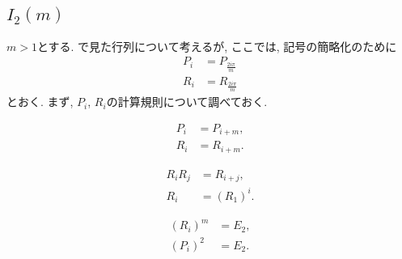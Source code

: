 \subsection{$I_2(m)$}
\label{ex:i2m:grp}
$m>1$とする.
で見た行列について考えるが,
ここでは, 記号の簡略化のために
\begin{align*}
  P_i&=P_{\frac{2i\pi}{m}}\\
  R_i&=R_{\frac{2i\pi}{m}}
\end{align*}
とおく.
まず, $P_i$, $R_i$の計算規則について調べておく.
\begin{lemma}
  \begin{align*}
    P_i &= P_{i+m},\\
    R_i &= R_{i+m}.
  \end{align*}
\end{lemma}
\begin{lemma}
  \begin{align*}
    R_i R_j&= R_{i+j},\\
    R_i&=(R_1)^i.
  \end{align*}
\end{lemma}
\begin{lemma}
  \begin{align*}
    (R_i)^m&=E_2,\\
    (P_i)^2&=E_2.
  \end{align*}
\end{lemma}

